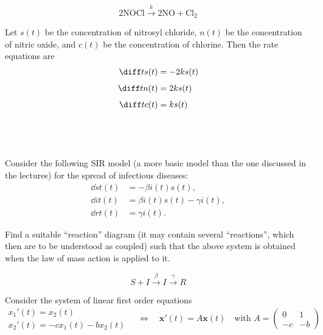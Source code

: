 \documentclass[a4paper]{article}
\begin{document}
$$2\text{NOCl} \xrightarrow{\ k\ } 2\text{NO} + \text{Cl}_2$$

Let $s(t)$ be the concentration of nitrosyl chloride, $n(t)$ be the concentration of nitric oxide, and $c(t)$ be the concentration of chlorine. Then the rate equations are \begin{align*}
	\diff t s(t) &= -2ks(t)\\[1ex]
	\diff t n(t) &= 2ks(t)\\[1ex]
	\diff t c(t) &= ks(t)
\end{align*}

\subsection{~} %

\begin{questionbody}
Consider the following SIR model (a more basic model than the one discussed in the
lectures) for the spread of infectious diseases: \begin{align*}
\dd st (t) &= -\beta i(t) s(t), \\
\dd it (t) &= \beta i(t) s(t) - \gamma i(t), \\
\dd rt (t) &= \gamma i(t).
\end{align*}

Find a suitable \enquote{reaction} diagram (it may contain several \enquote{reactions}, which then are to be understood as coupled) such that the above system is obtained when the law of mass action is applied to it.
\end{questionbody}

$$S + I \xrightarrow{\ \beta\ } I \xrightarrow{\ \gamma\ } R$$


\begin{questionbody}
Consider the system of linear first order equations \begin{equation*}
\begin{array}{l}
x_1'(t) = x_2(t) \\[0.5ex]
x_2'(t) = -c x_1(t) - b x_2(t)
\end{array}
\quad \Leftrightarrow \quad
\mathbf{x}'(t) = A \mathbf{x}(t) \quad\text{with } A = \begin{pmatrix} 0 & 1 \\ -c & -b \end{pmatrix}
\end{equation*}
\end{questionbody}
\end{document}
